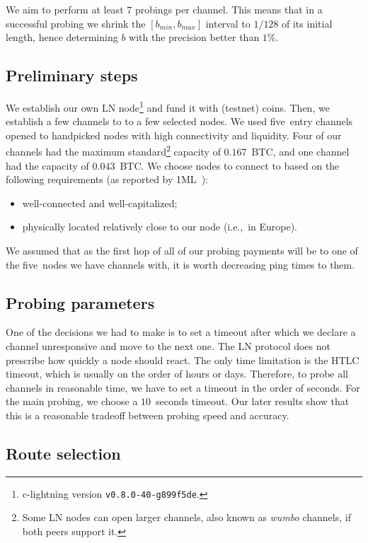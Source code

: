 We aim to perform at least $7$ probings per channel.
This means that in a successful probing we shrink the $[b_{min}, b_{max}]$ interval to $1/128$ of its initial length, hence determining $b$ with the precision better than $1\%$.


\subsection{Preliminary steps}

We establish our own LN node\footnote{c-lightning version \texttt{v0.8.0-40-g899f5de}.} and fund it with (testnet) coins.
Then, we establish a few channels to to a few selected nodes.
We used five~entry channels opened to handpicked nodes with high connectivity and liquidity.
Four of our channels had the maximum standard\footnote{Some LN nodes can open larger channels, also known as \textit{wumbo} channels, if both peers support it.} capacity of $0.167$~BTC, and one channel had the capacity of $0.043$~BTC.
We choose nodes to connect to based on the following requirements (as reported by 1ML~\cite{1MLTopConnected}):
\begin{itemize}
	\item well-connected and well-capitalized;
	\item physically located relatively close to our node (i.e.,~in Europe).
\end{itemize}
We assumed that as the first hop of all of our probing payments will be to one of the five~nodes we have channels with, it is worth decreasing ping times to them.

\subsection{Probing parameters}
One of the decisions we had to make is to set a timeout after which we declare a channel unresponsive and move to the next one.
The LN protocol does not prescribe how quickly a node should react.
The only time limitation is the HTLC timeout, which is usually on the order of hours or days.
Therefore, to probe all channels in reasonable time, we have to set a timeout in the order of seconds.
For the main probing, we choose a $10$~seconds timeout.
Our later results show that this is a reasonable tradeoff between probing speed and accuracy.

\subsection{Route selection}

